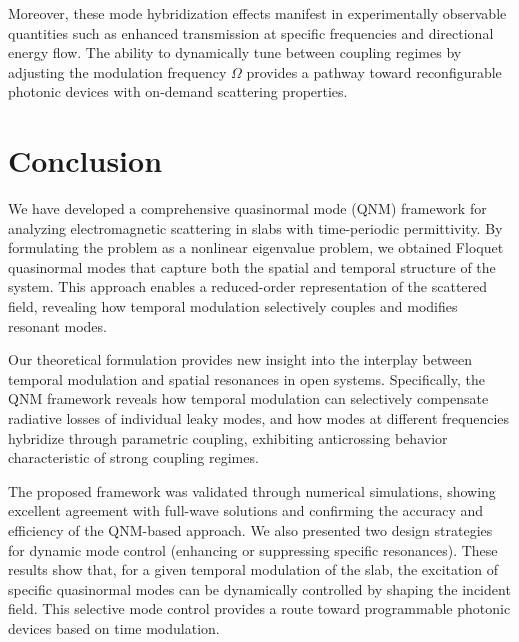 \documentclass[%
 reprint,
 amsmath,amssymb,
 aps,
 prb,
]{revtex4-2}
\newcommand{\corrections}[1]{#1}
\begin{document}
\corrections{
Moreover, these mode hybridization effects manifest in experimentally observable quantities such as enhanced transmission at specific frequencies and directional energy flow. The ability to dynamically tune between coupling regimes by adjusting the modulation frequency $\Omega$ provides a pathway toward reconfigurable photonic devices with on-demand scattering properties.}

\section{Conclusion}
\label{sec:conclusion}

We have developed a comprehensive quasinormal mode (QNM) framework for analyzing electromagnetic scattering in slabs with time-periodic permittivity. By formulating the problem as a nonlinear eigenvalue problem, we obtained Floquet quasinormal modes that capture both the spatial and temporal structure of the system. This approach enables a reduced-order representation of the scattered field, revealing how temporal modulation selectively couples and modifies resonant modes.

\corrections{Our theoretical formulation provides new insight into the interplay between temporal modulation and spatial resonances in open systems. Specifically, the QNM framework reveals how temporal modulation can selectively compensate radiative losses of individual leaky modes, and how modes at different frequencies hybridize through parametric coupling, exhibiting anticrossing behavior characteristic of strong coupling regimes.}

The proposed framework was validated through numerical simulations, showing excellent agreement with full-wave solutions and confirming the accuracy and efficiency of the QNM-based approach. \corrections{We also presented two design strategies for dynamic mode control (enhancing or suppressing specific resonances). These results show that, for a given temporal modulation of the slab, the excitation of specific quasinormal modes can be dynamically controlled by shaping the incident field. This selective mode control provides a route toward programmable photonic devices based on time modulation.}
\end{document}
